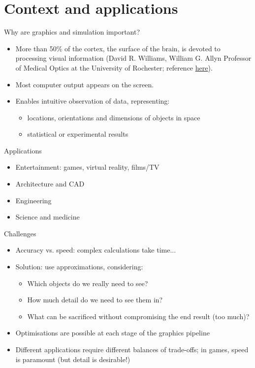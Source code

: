 \part{Context and applications}
\frame{\partpage}

\begin{frame}{Why are graphics and simulation important?}
	\begin{itemize}
		\pause\item More than 50\% of the cortex, the surface of the brain, is devoted to processing visual information (David R. Williams, William G. Allyn Professor of Medical Optics at the University of Rochester; reference \href{William G. Allyn Professor of Medical Optics}{here}).
		\pause\item Most computer output appears on the screen.
		\pause\item Enables intuitive observation of data, representing:
		\begin{itemize}
			\pause\item locations, orientations and dimensions of objects in space
			\pause\item statistical or experimental results
		\end{itemize}
	\end{itemize}
\end{frame}

\begin{frame}{Applications}
	\begin{itemize}
		\pause\item Entertainment: games, virtual reality, films/TV
		\pause\item Architecture and CAD
		\pause\item Engineering
		\pause\item Science and medicine
	\end{itemize}
\end{frame}

\begin{frame}{Challenges}
	\begin{itemize}		
		\pause\item Accuracy vs. speed: complex calculations take time...
		\pause\item Solution: use approximations, considering:
		\begin{itemize}
			\pause\item Which objects do we really need to see?
			\pause\item How much detail do we need to see them in?
			\pause\item What can be sacrificed without compromising the end result (too much)?
		\end{itemize}
		\pause\item Optimisations are possible at each stage of the graphics pipeline
		\pause\item Different applications require different balances of trade-offs; in games, speed is paramount (but detail is desirable!)
	\end{itemize}
\end{frame}
